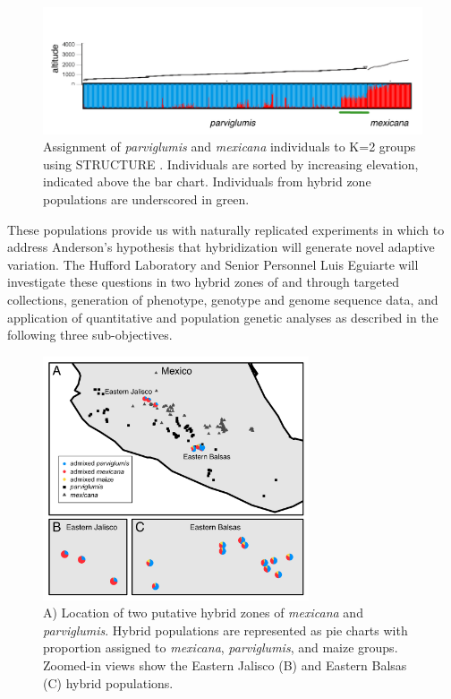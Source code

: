 \begin{figure}[tb] 
  \centering
   \includegraphics[width=\textwidth]{structure.pdf}
    \caption{Assignment of \emph{parviglumis} and \emph{mexicana} individuals to K=2 groups using STRUCTURE \citep{Pritchard2000}.  Individuals are sorted by increasing elevation, indicated above the bar chart. Individuals from hybrid zone populations are underscored in green.} 
\label{fig:structure}
\end{figure}

These populations provide us with naturally replicated experiments in which to address Anderson's \citeyearpar{Anderson1954} hypothesis that hybridization will generate novel adaptive variation.
The Hufford Laboratory and Senior Personnel Luis Eguiarte will investigate these questions in two hybrid zones of \zm{} and \zp{} through targeted collections, generation of phenotype, genotype and genome sequence data, and application of quantitative and population genetic analyses as described in the following three sub-objectives.

\begin{figure}[t]
  \centering
   \includegraphics[width=0.7\textwidth]{Figure1.jpg}
    \caption{A) Location of two putative hybrid zones of \emph{mexicana} and \emph{parviglumis}.  Hybrid populations are represented as pie charts with proportion assigned to \emph{mexicana}, \emph{parviglumis}, and maize groups. Zoomed-in views show the Eastern Jalisco (B) and Eastern Balsas (C) hybrid populations.} 
\label{fig:pies}
\end{figure}

